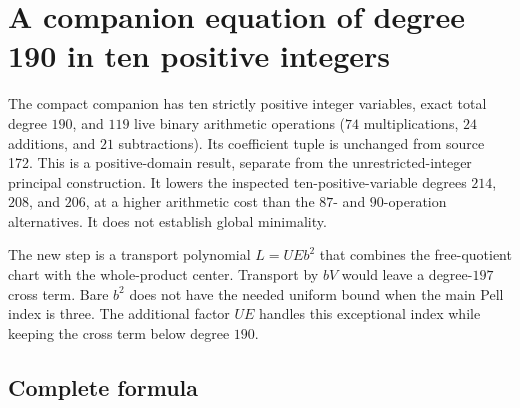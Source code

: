 \section{A companion equation of degree 190 in ten positive integers}
\label{sec:compact}

The compact companion has ten strictly positive integer variables, exact
total degree $190$, and $119$ live binary arithmetic operations
($74$ multiplications, $24$ additions, and $21$ subtractions).
Its coefficient tuple is unchanged from source 172.  This is a
positive-domain result, separate from the unrestricted-integer principal
construction.  It lowers the inspected ten-positive-variable degrees
$214$, $208$, and $206$, at a higher arithmetic cost than the $87$- and
$90$-operation alternatives.  It does not establish global minimality.

The new step is a transport polynomial $L=UEb^2$ that combines the
free-quotient chart with the whole-product center.  Transport by $bV$
would leave a degree-$197$ cross term.  Bare $b^2$ does not have the needed
uniform bound when the main Pell index is three.  The additional factor
$UE$ handles this exceptional index while keeping the cross term below
degree $190$.

\subsection{Complete formula}


